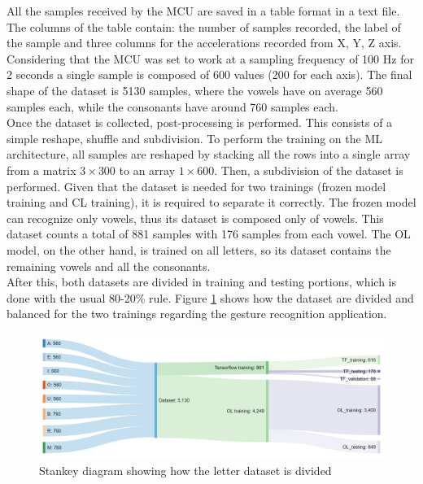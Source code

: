 \documentclass[12pt]{report}
\begin{document}
All the samples received by the MCU are saved in a table format in a text file. The columns of the table contain: the number of samples recorded, the label of the sample and three columns for the accelerations recorded from X, Y, Z axis. Considering that the MCU was set to work at a sampling frequency of 100 Hz for 2 seconds a single sample is composed of 600 values (200 for each axis). 
The final shape of the dataset is 5130 samples, where the vowels have on average 560 samples each, while the consonants have around 760 samples each. \\
Once the dataset is collected, post-processing is performed. This consists of a simple reshape, shuffle and subdivision. To perform the training on the ML architecture, all samples are reshaped by stacking all the rows into a single array from a matrix $3 \times 300$ to an array $1 \times 600$. Then, a subdivision of the dataset is performed. Given that the dataset is needed for two trainings (frozen model training and CL training), it is required to separate it correctly. The frozen model can recognize only vowels, thus its dataset is composed only of vowels. This dataset counts a total of 881 samples with 176 samples from each vowel. The OL model, on the other hand, is trained on all letters, so its dataset contains the remaining vowels and all the consonants. \\
After this, both datasets are divided in training and testing portions, which is done with the usual 80-20\% rule. Figure \ref{fig:flow_dataset_letters} shows how the dataset are divided and balanced for the two trainings regarding the gesture recognition application.

\begin{figure}[h!]
    \centering
    \includegraphics[width=140mm]{Figures/Chapter4/flow_dataset_letters.png} 
    \caption{Stankey diagram showing how the letter dataset is divided}
    \label{fig:flow_dataset_letters}    
\end{figure}
\end{document}
